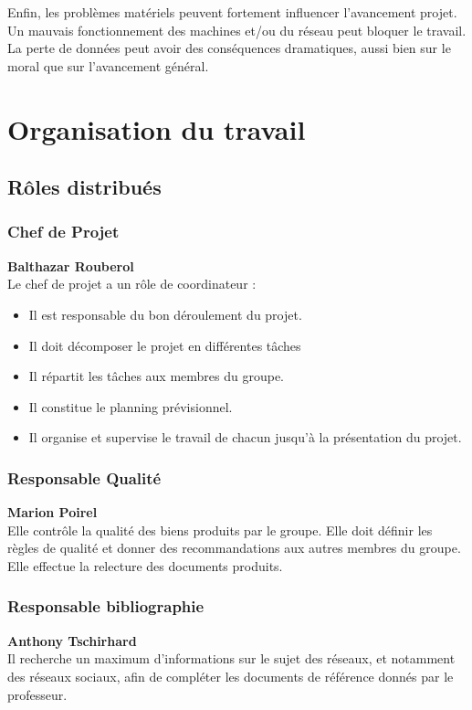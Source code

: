 Enfin, les problèmes matériels peuvent fortement influencer l'avancement projet. Un mauvais fonctionnement des machines et/ou du réseau peut bloquer le travail. La perte de données peut avoir des conséquences dramatiques, aussi bien sur le moral que sur l'avancement général.

\section{Organisation du travail}
\subsection{Rôles distribués}

\subsubsection{Chef de Projet}
\textbf{Balthazar Rouberol}\\
Le chef de projet a un rôle de coordinateur :  
\begin{itemize}
\item Il est responsable du bon déroulement du projet.
\item Il doit décomposer le projet en différentes tâches
\item Il répartit les tâches aux membres du groupe.
\item Il constitue le planning prévisionnel.
\item Il organise et supervise le travail de chacun jusqu'à la présentation du projet.
\end{itemize}
  
\subsubsection{Responsable Qualité}
\textbf{Marion Poirel}\\
Elle contrôle la qualité des biens produits par le groupe. Elle doit définir les règles de qualité et donner des recommandations aux autres membres du groupe. Elle effectue la relecture des documents produits.

\subsubsection{Responsable bibliographie}
\textbf{Anthony Tschirhard}\\
Il recherche un maximum d'informations sur le sujet des réseaux, et notamment des réseaux sociaux, afin de compléter les documents de référence donnés par le professeur.


